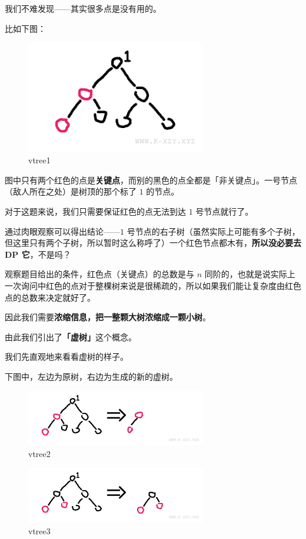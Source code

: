 我们不难发现——其实很多点是没有用的。

比如下图：

\begin{figure}[htbp]
\centering
\includegraphics[width=0.7\textwidth]{docs/ds/images/vtree1.png} 
\caption{vtree1}
\end{figure}

图中只有两个红色的点是\textbf{关键点}，而别的黑色的点全都是「非关键点」。一号节点（敌人所在之处）是树顶的那个标了 $1$ 的节点。

对于这题来说，我们只需要保证红色的点无法到达 $1$ 号节点就行了。

通过肉眼观察可以得出结论——$1$ 号节点的右子树（虽然实际上可能有多个子树，但这里只有两个子树，所以暂时这么称呼了）一个红色节点都木有，\textbf{所以没必要去 DP 它}，不是吗？

观察题目给出的条件，红色点（关键点）的总数是与 $n$ 同阶的，也就是说实际上一次询问中红色的点对于整棵树来说是很稀疏的，所以如果我们能让复杂度由红色点的总数来决定就好了。

因此我们需要\textbf{浓缩信息，把一整颗大树浓缩成一颗小树}。

由此我们引出了\textbf{「虚树」}这个概念。

我们先直观地来看看虚树的样子。

下图中，左边为原树，右边为生成的新的虚树。

\begin{figure}[htbp]
\centering
\includegraphics[width=0.7\textwidth]{docs/ds/images/vtree2.png} 
\caption{vtree2}
\end{figure}

\begin{figure}[htbp]
\centering
\includegraphics[width=0.7\textwidth]{docs/ds/images/vtree3.png} 
\caption{vtree3}
\end{figure}

